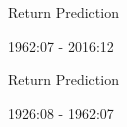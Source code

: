 \documentclass{beamer}
\begin{document}
%			

\begin{frame}{Return Prediction}
	\vspace{-6pt}
	\begin{center}
		1962:07 - 2016:12
	\end{center}
	\vspace{-30pt}
	\begin{table}
		\begin{adjustbox}{width=\textwidth,height=3.5cm}
			
		\end{adjustbox}
	\end{table}
\end{frame}

%			
%		

\begin{frame}{Return Prediction}
	\vspace{-6pt}
	\begin{center}
		1926:08 - 1962:07
	\end{center}
	\vspace{-30pt}
	\begin{table}
		\begin{adjustbox}{width=\textwidth,height=3.5cm}
			
		\end{adjustbox}
		
	\end{table}
\end{frame}
\end{document}
